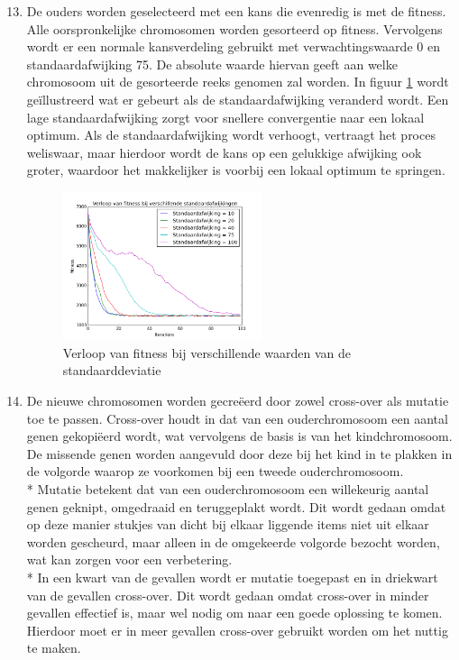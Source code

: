 \documentclass[a4paper,10pt,fleqn]{article}
\begin{document}
\begin{enumerate}[1.]
  \setcounter{enumi}{12}


    \item De ouders worden geselecteerd met een kans die evenredig is met de fitness. Alle oorspronkelijke chromosomen worden gesorteerd op fitness. Vervolgens wordt er een normale kansverdeling gebruikt met verwachtingswaarde 0 en standaardafwijking 75. De absolute waarde hiervan geeft aan welke chromosoom uit de gesorteerde reeks genomen zal worden. In figuur \ref{std} wordt geïllustreerd wat er gebeurt als de standaardafwijking veranderd wordt. Een lage standaardafwijking zorgt voor snellere convergentie naar een lokaal optimum. Als de standaardafwijking wordt verhoogt, vertraagt het proces weliswaar, maar hierdoor wordt de kans op een gelukkige afwijking ook groter, waardoor het makkelijker is voorbij een lokaal optimum te springen.

    \begin{figure}[!ht]
    \centering
    \includegraphics[width=0.55\textwidth]{images/Verloop_bij_std}
    \caption{Verloop van fitness bij verschillende waarden van de standaarddeviatie}
    \label{std}
    \end{figure}

    \item De nieuwe chromosomen worden gecreëerd door zowel cross-over als mutatie toe te passen. Cross-over houdt in dat van een ouderchromosoom een aantal genen gekopiëerd wordt, wat vervolgens de basis is van het kindchromosoom. De missende genen worden aangevuld door deze bij het kind in te plakken in de volgorde waarop ze voorkomen bij een tweede ouderchromosoom.
    \\* Mutatie betekent dat van een ouderchromosoom een willekeurig aantal genen geknipt, omgedraaid en teruggeplakt wordt. Dit wordt gedaan omdat op deze manier stukjes van dicht bij elkaar liggende items niet uit elkaar worden gescheurd, maar alleen in de omgekeerde volgorde bezocht worden, wat kan zorgen voor een verbetering.
    \\* In een kwart van de gevallen wordt er mutatie toegepast en in driekwart van de gevallen cross-over. Dit wordt gedaan omdat cross-over in minder gevallen effectief is, maar wel nodig om naar een goede oplossing te komen. Hierdoor moet er in meer gevallen cross-over gebruikt worden om het nuttig te maken.



\end{enumerate}
\end{document}
